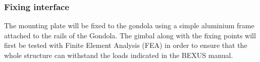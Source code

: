 




\subsubsection{Fixing interface}
\label {sec:4.4.5}
The mounting plate will be fixed to the gondola using a simple aluminium frame attached to the rails of the Gondola. The gimbal along with the fixing points will first be tested with Finite Element Analysis (FEA) in order to ensure that the whole structure can withstand the loads indicated in the BEXUS manual.
